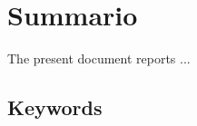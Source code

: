
\chapter*{Summario}\label{sec:main}

The present document reports ...

\section*{Keywords}
\begingroup\footnotesize
\docKeywords
\endgroup


